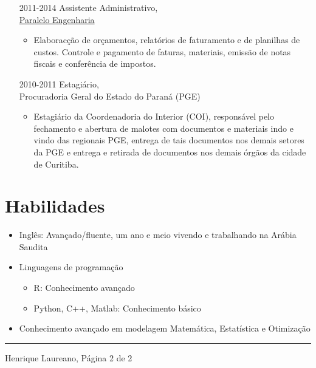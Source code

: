 \documentclass[12pt]{article}
\newcommand{\horrule}[1]{\noindent\rule{\linewidth}{#1}}
\begin{document}
\begin{itemize}
 \item[2011-2014] Assistente Administrativo,\\
                  \href{https://paralelo.eng.br/}{\color{blue}Paralelo Engenharia}
  \begin{itemize}
   \item Elaborac\c{c}\~{a}o de or\c{c}amentos, relat\'{o}rios de
         faturamento e de planilhas de custos. Controle e pagamento de
         faturas, materiais, emiss\~{a}o de notas fiscais e
         confer\^{e}ncia de impostos.
  \end{itemize}

 \item[2010-2011] Estagi\'{a}rio,\\
                  Procuradoria Geral do Estado do Paran\'{a} (PGE)
  \begin{itemize}
   \item Estagi\'{a}rio da Coordenadoria do Interior (COI),
         respons\'{a}vel pelo fechamento e abertura de malotes com
         documentos e materiais indo e vindo das regionais PGE, entrega de
         tais documentos nos demais setores da PGE e entrega e retirada de
         documentos nos demais \'{o}rg\~{a}os da cidade de Curitiba.
  \end{itemize}
\end{itemize}

\section*{Habilidades}

\begin{itemize}
 \item Ingl\^{e}s: Avan\c{c}ado/fluente, um ano e meio vivendo e
       trabalhando na Ar\'{a}bia Saudita
 \item Linguagens de programa\c{c}\~{a}o
  \begin{itemize}
   \item R: Conhecimento avan\c{c}ado
   \item Python, C++, Matlab: Conhecimento b\'{a}sico
  \end{itemize}
 \item Conhecimento avan\c{c}ado em modelagem Matem\'{a}tica,
       Estat\'{i}stica e Otimiza\c{c}\~{a}o
\end{itemize}

\vspace{\fill}
\horrule{1pt}
\noindent Henrique Laureano, \hfill P\'{a}gina 2 de 2
\end{document}
